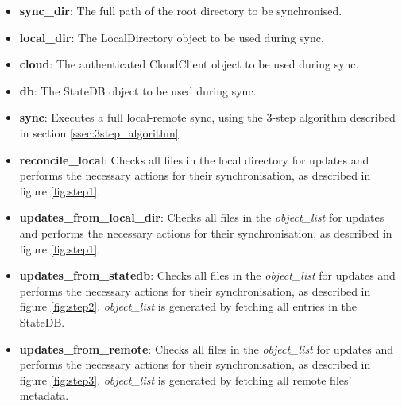    \begin{itemize}
      \item \textbf{sync\_dir}: The full path of the root directory to be synchronised.
      \item \textbf{local\_dir}: The LocalDirectory object to be used during sync.
      \item \textbf{cloud}: The authenticated CloudClient object to be used during sync.
      \item \textbf{db}: The StateDB object to be used during sync.\\

      \item \textbf{sync}: Executes a full local-remote sync, using the 3-step algorithm described in section \ref{ssec:3step_algorithm}.
      \item \textbf{reconcile\_local}: Checks all files in the local directory for updates and performs the necessary actions for their synchronisation, as described in figure \ref{fig:step1}.
      \item \textbf{updates\_from\_local\_dir}: Checks all files in the \emph{object\_list} for updates and performs the necessary actions for their synchronisation, as described in figure \ref{fig:step1}.
      \item \textbf{updates\_from\_statedb}: Checks all files in the \emph{object\_list} for updates and performs the necessary actions for their synchronisation, as described in figure \ref{fig:step2}. \emph{object\_list} is generated by fetching all entries in the StateDB.
      \item \textbf{updates\_from\_remote}: Checks all files in the \emph{object\_list} for updates and performs the necessary actions for their synchronisation, as described in figure \ref{fig:step3}. \emph{object\_list} is generated by fetching all remote files' metadata.
    \end{itemize}